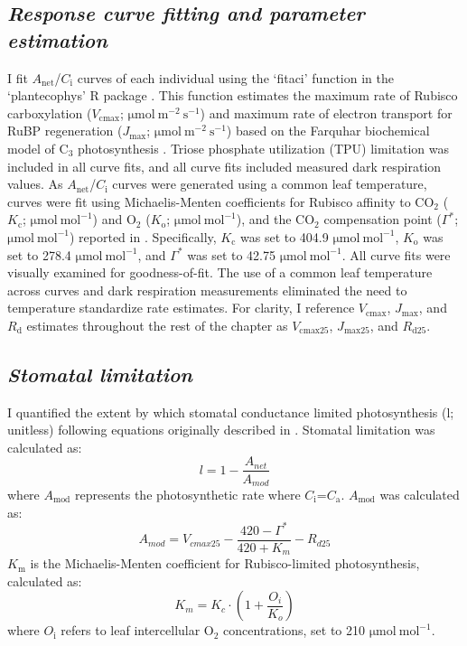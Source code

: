 \subsection{\textit{Response curve fitting and parameter estimation}}
\noindent I fit $A_\mathrm{net}$/$C_\mathrm{i}$ curves of each individual using the `fitaci’ function in the `plantecophys’ R package . This function estimates the maximum rate of Rubisco carboxylation ($V_\mathrm{cmax}$; $\mathrm{\mu mol\ m^{-2}\ s^{-1}}$) and maximum rate of electron transport for RuBP regeneration ($J_\mathrm{max}$; $\mathrm{\mu mol\ m^{-2}\ s^{-1}}$) based on the Farquhar biochemical model of C$_{3}$ photosynthesis . Triose phosphate utilization (TPU) limitation was included in all curve fits, and all curve fits included measured dark respiration values. As $A_\mathrm{net}$/$C_\mathrm{i}$ curves were generated using a common leaf temperature, curves were fit using Michaelis-Menten coefficients for Rubisco affinity to CO$_2$ ($K_\mathrm{c}$; $\mathrm{\mu mol\ mol^{-1}}$) and $\mathrm{O_2}$ ($K_\mathrm{o}$; $\mathrm{\mu mol\ mol^{-1}}$), and the CO$_2$ compensation point ($\Gamma^*$; $\mathrm{\mu mol\ mol^{-1}}$) reported in . Specifically, $K_\mathrm{c}$ was set to 404.9 $\mathrm{\mu mol\ mol^{-1}}$, $K_\mathrm{o}$ was set to 278.4 $\mathrm{\mu mol\ mol^{-1}}$, and $\Gamma^*$ was set to 42.75 $\mathrm{\mu mol\ mol^{-1}}$. All curve fits were visually examined for goodness-of-fit. The use of a common leaf temperature across curves and dark respiration measurements eliminated the need to temperature standardize rate estimates. For clarity, I reference $V_\mathrm{cmax}$, $J_\mathrm{max}$, and $R_\mathrm{d}$ estimates throughout the rest of the chapter as $V_\mathrm{cmax25}$, $J_\mathrm{max25}$, and $R_\mathrm{d25}$.

\subsection{\textit{Stomatal limitation}}
\noindent I quantified the extent by which stomatal conductance limited photosynthesis (l; unitless) following equations originally described in . Stomatal limitation was calculated as:
\begin{equation} \label{eq_5.3}
    l = 1 - \frac{A_{net}}{A_{mod}}
\end{equation}
\noindent where $A_\mathrm{mod}$ represents the photosynthetic rate where $C_\mathrm{i}$=$C_\mathrm{a}$. $A_\mathrm{mod}$ was calculated as:
\begin{equation} \label{eq_5.4}
    A_{mod} = V_{cmax25} - \frac{420 - \Gamma^*}{420 + K_{m}} - R_{d25}
\end{equation}
\noindent $K_\mathrm{m}$ is the Michaelis-Menten coefficient for Rubisco-limited photosynthesis, calculated as:
\begin{equation} \label{eq_5.5}
    K_{m} = K_{c} \cdot \left ( 1 + \frac{O_i}{K_o} \right )
\end{equation}
\noindent where $O_\mathrm{i}$ refers to leaf intercellular O$_2$ concentrations, set to 210 $\mathrm{\mu mol\ mol^{-1}}$.

